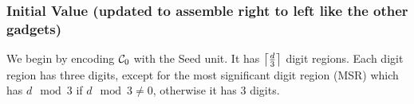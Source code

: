 \subsubsection{Initial Value (updated to assemble right to left like the other gadgets)}
We begin by encoding $\counterstart$ with the Seed unit. It has $\ceil*{\frac{d}{3}}$ digit regions.
Each digit region has three digits, except for the most significant digit region (MSR) which has $d \mod 3$
if $d \mod 3 \not= 0$, otherwise it has 3 digits.


\begin{figure}[H]
    \centering
    \hfill%

\end{figure}
